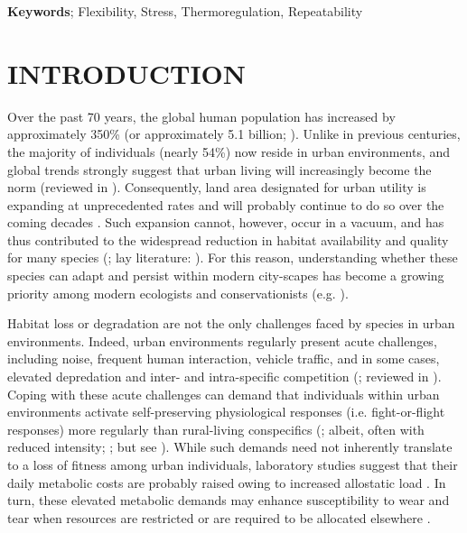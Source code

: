 \documentclass[12pt]{article}
\begin{document}
\par\noindent \textbf{Keywords}; Flexibility, Stress, Thermoregulation, Repeatability

\clearpage

\fontsize{12pt}{24pt}\selectfont
\section{INTRODUCTION}
\vspace{0.5cm}

\noindent Over the past 70 years, the global human population has increased by approximately 350\% (or approximately 5.1 billion; \citealt{un_2019}). Unlike in previous centuries, the majority of individuals (nearly 54\%) now reside in urban environments, and global trends strongly suggest that urban living will increasingly become the norm (reviewed in \citealt{lerch_2017}). Consequently, land area designated for urban utility is expanding at unprecedented rates and will probably continue to do so over the coming decades \citep{angel_2011}. Such expansion cannot, however, occur in a vacuum, and has thus contributed to the widespread reduction in habitat availability and quality for many species (\citealt{grimm_2008,seto_2012,freeman_2019}; lay literature: \citealt{thomas_2017}). For this reason, understanding whether these species can adapt and persist within modern city-scapes has become a growing priority among modern ecologists and conservationists (e.g. \citealt{birnie_2016,ouyang_2018}). \vspace{1cm}

\noindent Habitat loss or degradation are not the only challenges faced by species in urban environments. Indeed, urban environments regularly present acute challenges, including noise, frequent human interaction, vehicle traffic, and in some cases, elevated depredation and inter- and intra-specific competition (\citealt{johnson_2012,hernandez_2014,newsome_2015,vincze_2017}; reviewed in \citealt{lowry_2013}). Coping with these acute challenges can demand that individuals within urban environments activate self-preserving physiological responses (i.e. fight-or-flight responses) more regularly than rural-living conspecifics (\citealt{bonier_2012,watson_2017}; albeit, often with reduced intensity; \citealt{partecke_2006,french_2008}; but see \citealt{fokidis_2009}). While such demands need not inherently translate to a loss of fitness among urban individuals, laboratory studies suggest that their daily metabolic costs are probably raised owing to increased allostatic load \citep{depke_2008,jimeno_2017}. In turn, these elevated metabolic demands may enhance susceptibility to wear and tear when resources are restricted or are required to be allocated elsewhere \citep{romero_2009,breuner_2019}. \vspace{1cm}
\end{document}
